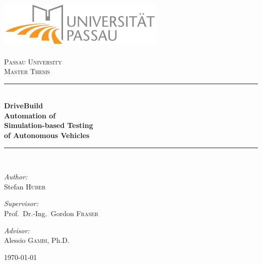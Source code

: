\begin{titlepage}

\date{\today}

\begin{center}

\includegraphics[width=0.6\textwidth]{./pictures/Logo-Uni-Passau.jpg}\\[1cm]

\ \\[1cm]

\textsc{\LARGE Passau University}\\[1.5cm]

\textsc{\Large Master Thesis}\\[0.5cm]

\newcommand{\HRule}{\rule{\linewidth}{0.5mm}}
\HRule{}\\[0.4cm]
{\huge \bfseries DriveBuild\\Automation of\\Simulation-based Testing\\of Autonomous Vehicles}\\[0.4cm]

\HRule{}\\[1.5cm]

\begin{minipage}[t]{0.45\textwidth}
\begin{flushleft} \large
\emph{Author:}\\
Stefan \textsc{Huber} %
\end{flushleft}
\end{minipage}
\hfill
\begin{minipage}[t]{0.45\textwidth}
\begin{flushright} \large
\emph{Supervisor:} \\
Prof.\ Dr.-Ing.\ Gordon \textsc{Fraser}\\

\vspace{0.5cm}

\emph{Advisor:}\\
Alessio \textsc{Gambi}, Ph.D.
\end{flushright}
\end{minipage}

\vfill
\vfill

\vfill

\today

\end{center}

\end{titlepage}
